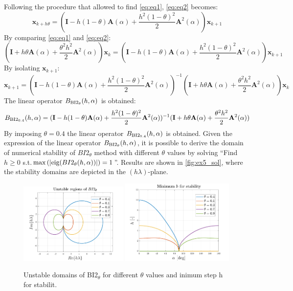\documentclass[11pt,a4paper,oneside]{article}
\renewcommand{\vec}[1]{\mathbf{#1}}
\begin{document}
Following the procedure that allowed to find \autoref{eq:eq1}, \autoref{eq:eq2} becomes:
\begin{equation}
    \vec{x}_{k+h\theta} = (\vec{I} - h(1-\theta)\vec{A}(\alpha) + \frac{h^2(1-\theta)^2}{2}\vec{A}^2(\alpha))\vec{x}_{k+1}
\end{equation}
By comparing \autoref{eq:eq1} and \autoref{eq:eq2}:
\begin{equation}
    (\vec{I} + h\theta\vec{A}(\alpha) + \frac{\theta^2h^2}{2}\vec{A}^2(\alpha))\vec{x}_k = (\vec{I} - h(1-\theta)\vec{A}(\alpha) + \frac{h^2(1-\theta)^2}{2}\vec{A}^2(\alpha))\vec{x}_{k+1}
\end{equation}
By isolating $\vec{x}_{k+1}$:
\begin{equation}
    \vec{x}_{k+1} = (\vec{I} - h(1-\theta)\vec{A}(\alpha) + \frac{h^2(1-\theta)^2}{2}\vec{A}^2(\alpha))^{-1}(\vec{I} + h\theta\vec{A}(\alpha) + \frac{\theta^2h^2}{2}\vec{A}^2(\alpha))\vec{x}_k
\end{equation}
The linear operator $B_{\rm BI2_{\theta}}(h,\alpha)$ is obtained:
\begin{equation}
    B_{\rm BI2_{0.4}}(h,\alpha) = (\vec{I} - h(1-\theta)\vec{A}(\alpha) + \frac{h^2(1-\theta)^2}{2}\vec{A}^2(\alpha))^{-1}(\vec{I} + h\theta\vec{A}(\alpha) + \frac{\theta^2h^2}{2}\vec{A}^2(\alpha))
\end{equation}
By imposing $\theta = 0.4$ the linear operator $B_{\rm BI2_{0.4}}(h,\alpha)$ is obtained.
Given the expression of the linear operator $B_{\rm BI2_{\theta}}(h,\alpha)$, it is possible 
to derive the domain of numerical stability of $BI2_{\theta}$ method with different $\theta$ 
values by solving ``Find $h\ge 0$ s.t.$\max\left(|{\rm eig}(BI2_{\theta}(h,\alpha))|\right) = 1$''.
 Results are shown in \autoref{fig:ex5_sol}, where the stability domains are depicted in the $(h\lambda)$-plane.

\begin{figure}[h]
    \centering
    \includegraphics[width=0.48\textwidth]{gfx/ex5_1.pdf}
    \includegraphics[width=0.50\textwidth]{gfx/ex5_2.pdf}
    \caption{Unstable domains of BI2$_{\theta}$ for different $\theta$ values and inimum step h for stabilit.}\label{fig:ex5_sol}
\end{figure}
\end{document}
